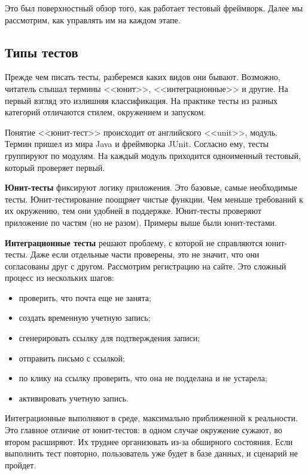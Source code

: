 Это был поверхностный обзор того, как работает тестовый фреймворк. Далее мы
рассмотрим, как управлять им на каждом этапе.

\subsection{Типы тестов}

Прежде чем писать тесты, разберемся каких видов они бывают. Возможно, читатель
слышал термины <<юнит>>, <<интеграционные>> и другие. На первый взгляд это
излишняя классификация. На практике тесты из разных категорий отличаются стилем,
окружением и запуском.

Понятие <<юнит-тест>> происходит от английского <<unit>>, модуль. Термин пришел
из мира Java и фреймворка JUnit. Согласно ему, тесты группируют по модулям. На
каждый модуль приходится одноименный тестовый, который проверяет первый.

\textbf{Юнит-тесты} фиксируют логику приложения. Это базовые, самые необходимые
тесты. Юнит-тестирование поощряет чистые функции. Чем меньше требований к их
окружению, тем они удобней в поддержке. Юнит-тесты проверяют приложение по
частям (но не разом). Примеры выше были юнит-тестами.

\textbf{Интеграционные тесты} решают проблему, с которой не справляются
юнит-тесты. Даже если отдельные части проверены, это не значит, что они
согласованы друг с другом. Рассмотрим регистрацию на сайте. Это сложный процесс
из нескольких шагов:

\begin{itemize}

\item
  проверить, что почта еще не занята;

\item
  создать временную учетную запись;

\item
  сгенерировать ссылку для подтверждения записи;

\item
  отправить письмо с ссылкой;

\item
  по клику на ссылку проверить, что она не подделана и не устарела;

\item
  активировать учетную запись.

\end{itemize}

Интеграционные выполняют в среде, максимально приближенной к реальности. Это
главное отличие от юнит-тестов: в одном случае окружение сужают, во втором
расширяют. Их труднее организовать из-за обширного состояния. Если выполнить
тест повторно, пользователь уже будет в базе данных, и сценарий не пройдет.

